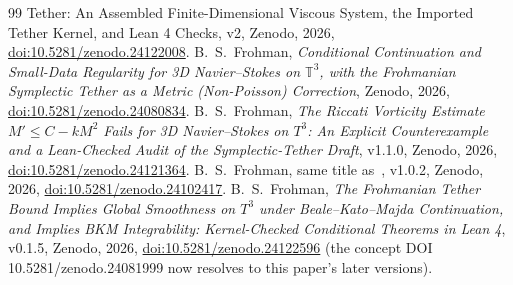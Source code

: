 \documentclass[11pt,a4paper]{article}
\theoremstyle{definition}
\theoremstyle{remark}
\begin{document}
\begin{thebibliography}{99}
{  Tether: An Assembled Finite-Dimensional Viscous System, the Imported Tether Kernel, and Lean 4
  Checks}, v2, Zenodo, 2026,
  \href{https://doi.org/10.5281/zenodo.24122008}{doi:10.5281/zenodo.24122008}.
 B.~S.~Frohman, \emph{Conditional Continuation and Small-Data Regularity for
  3D Navier--Stokes on $\mathbb{T}^3$, with the Frohmanian Symplectic Tether as a Metric
  (Non-Poisson) Correction}, Zenodo, 2026,
  \href{https://doi.org/10.5281/zenodo.24080834}{doi:10.5281/zenodo.24080834}.
 B.~S.~Frohman, \emph{The Riccati Vorticity Estimate $M'\le C-kM^2$ Fails for
  3D Navier--Stokes on $T^3$: An Explicit Counterexample and a Lean-Checked Audit of the
  Symplectic-Tether Draft}, v1.1.0, Zenodo, 2026,
  \href{https://doi.org/10.5281/zenodo.24121364}{doi:10.5281/zenodo.24121364}.
 B.~S.~Frohman, same title as~\cite{Fr24121364}, v1.0.2, Zenodo, 2026,
  \href{https://doi.org/10.5281/zenodo.24102417}{doi:10.5281/zenodo.24102417}.
 B.~S.~Frohman, \emph{The Frohmanian Tether Bound Implies Global Smoothness on
  $T^3$ under Beale--Kato--Majda Continuation, and Implies BKM Integrability: Kernel-Checked
  Conditional Theorems in Lean 4}, v0.1.5, Zenodo, 2026,
  \href{https://doi.org/10.5281/zenodo.24122596}{doi:10.5281/zenodo.24122596}
  (the concept DOI 10.5281/zenodo.24081999 now resolves to this paper's later versions).
\end{thebibliography}
\end{document}
